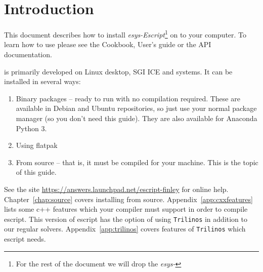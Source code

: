 %
%
%

\chapter{Introduction}
This document describes how to install \emph{esys-Escript}\footnote{For the rest of the document we will drop the \emph{esys-}} on to your computer.
To learn how to use \esfinley please see the Cookbook, User's guide or the API documentation.

\esfinley is primarily developed on Linux desktop, SGI ICE and \macosx systems.
It can be installed in several ways:
\begin{enumerate}
  \item Binary packages -- ready to run with no compilation required.
  These are available in Debian and Ubuntu repositories, so just use your normal package manager (so you don't need this guide). They are also available for Anaconda Python 3.
  \item Using flatpak
  \item From source -- that is, it must be compiled for your machine.
This is the topic of this guide.
\end{enumerate}

See the site \url{https://answers.launchpad.net/escript-finley} for online help.
Chapter~\ref{chap:source} covers installing from source.
Appendix~\ref{app:cxxfeatures} lists some c++ features which your compiler must support in order to compile escript.
This version of escript has the option of using \texttt{Trilinos} in addition to our regular solvers.
Appendix~\ref{app:trilinos} covers features of \texttt{Trilinos} which escript needs.
